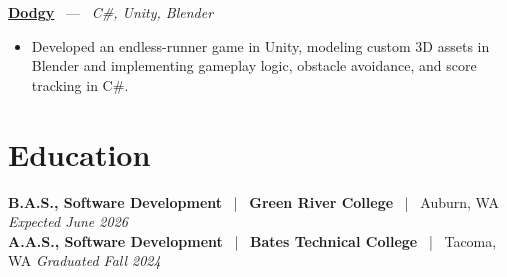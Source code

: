 \documentclass[10pt, letterpaper]{article}
\newcommand{\jobhead}[4]{%
  \vspace{3pt}%
  {\bfseries\color{dark}#1}%
  ~{\color{light}|}~%
  {\bfseries\color{navy}#2}%
  ~{\color{light}|}~%
  {\color{light}#3}%
  \hfill{\color{light}\small\textit{#4}}\\[-2pt]%
}
\newcommand{\projhead}[3]{%
  \vspace{3pt}%
  {\bfseries\color{dark}\href{#2}{#1}}%
  ~{\color{light}---}~%
  {\color{light}\small\textit{#3}}\\[-2pt]%
}
\begin{document}
\projhead{Dodgy}{https://timyd.itch.io/dodgy}{C\#, Unity, Blender}
\begin{itemize}
  \item Developed an endless-runner game in Unity, modeling custom 3D assets in Blender and implementing gameplay logic, obstacle avoidance, and score tracking in C\#.
\end{itemize}

\section{Education}

\jobhead{B.A.S., Software Development}{Green River College}{Auburn, WA}{Expected June 2026}
\jobhead{A.A.S., Software Development}{Bates Technical College}{Tacoma, WA}{Graduated Fall 2024}
\end{document}
